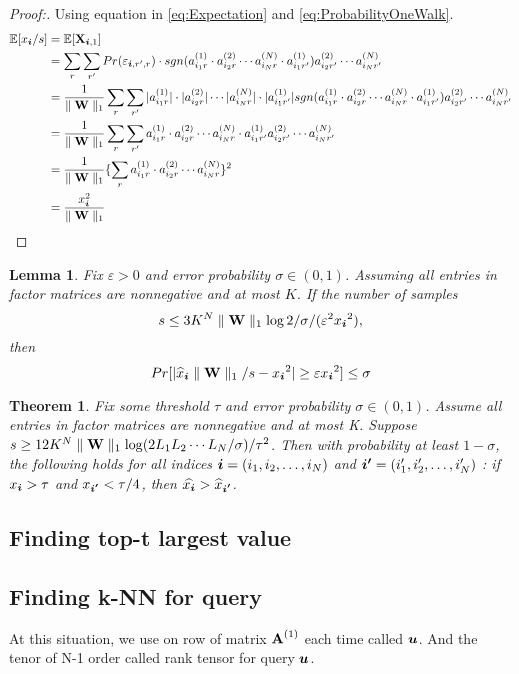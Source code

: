 \documentclass{article}
\newcommand{\Sca}[3]{{#1}^{(#2)}_{i_#2#3}}%
\newcommand{\V}[1]{{\bm{{\MakeLowercase{#1}}}}}%
\newcommand{\M}[1]{{\bm{\mathbf{\MakeUppercase{#1}}}}}%
\newcommand{\norm}[2]{\parallel#1\parallel_{#2}}
\newtheorem{lemma}{Lemma}[section]
\newtheorem{theorem}{Theorem}[section]
\begin{document}
\begin{proof}[Proof:]
Using equation in \ref{eq:Expectation} and \ref{eq:ProbabilityOneWalk}.
\begin{align*}
\mathbb{E}[x_{\V{i}}/s]
&= \mathbb{E}[\M{X}_{\V{i},1}]\\
&=\sum_{r}\sum_{r'}Pr(\varepsilon_{\V{i},r',r})\cdot sgn(\Sca{a}{1}{r}\cdot\Sca{a}{2}{r}\cdots\Sca{a}{N}{r}\cdot\Sca{a}{1}{r'})
\Sca{a}{2}{r'}\cdots\Sca{a}{N}{r'}\\
&=\frac{1}{\norm{\M{W}}{1}}\sum_{r}\sum_{r'}|\Sca{a}{1}{r}|\cdot|\Sca{a}{2}{r}|\cdots|\Sca{a}{N}{r}|\cdot|\Sca{a}{1}{r'}|sgn(\Sca{a}{1}{r}\cdot\Sca{a}{2}{r}\cdots\Sca{a}{N}{r}\cdot\Sca{a}{1}{r'})
\Sca{a}{2}{r'}\cdots\Sca{a}{N}{r'}\\
&=\frac{1}{\norm{\M{W}}{1}} \sum_{r}\sum_{r'} \Sca{a}{1}{r}\cdot\Sca{a}{2}{r}\cdots\Sca{a}{N}{r}\cdot\Sca{a}{1}{r'} \Sca{a}{2}{r'}\cdots\Sca{a}{N}{r'}\\
&=\frac{1}{\norm{\M{W}}{1}}\{\sum_{r}\Sca{a}{1}{r}\cdot\Sca{a}{2}{r}\cdots\Sca{a}{N}{r}\}^2\\
&=\frac{x_{\V{i}}^2}{\norm{\M{W}}{1}}
\end{align*}
\end{proof}



\begin{lemma}\label{Bound}
Fix $\varepsilon > 0$ and error probability $\sigma \in (0,1)$. Assuming all entries in factor matrices are nonnegative and at most $K$. If the number of samples
\[
s \leq 3K^N\norm{\M{W}}{1}\log{2/\sigma}/(\varepsilon ^2{x_{\V{i}}}^2),
\]
then
\[
Pr[|{\widehat{x}_{\V{i}}}\norm{\M{W}}{1}/s-{x_{\V{i}}}^2| \geq \varepsilon{x_{\V{i}}}^2] \leq \sigma
\]
\end{lemma}
\begin{theorem}
Fix some threshold $\tau$ and error probability $\sigma\in(0,1)$. Assume all entries in factor matrices are nonnegative and at most  K. Suppose $s \geq 12K^N\norm{\M{W}}{1}\log(2L_1L_2\cdots L_N/\sigma)/{\tau^2}$. Then with probability at least $1-\sigma$, the following holds for all indices $\V{i} = (i_1,i_2,\ldots,i_N)$ and $\V{i'} = (i'_1,i'_2,\ldots,i'_N)$ : if $x_{\V{i}}>\tau$ and $ x_{\V{i'}} < \tau/4$, then $\widehat{x_{\V{i}}}>\widehat{x}_{\V{i'}}$.
\end{theorem}

\subsection{Finding top-t largest value}


\subsection{Finding k-NN for query}
At this situation, we use on row of matrix $\M{A}^{(1)}$ each time called $\V{u}$. And the tenor of N-1 order called rank tensor for query $\V{u}$.
\end{document}
